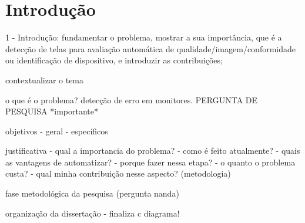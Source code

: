 \chapter{Introdução}



1 - Introdução: fundamentar o problema, mostrar a sua importância, que é a detecção de telas para avaliação automática de qualidade/imagem/conformidade ou identificação de dispositivo, e introduzir as contribuições;

contextualizar o tema

o que é o problema?
detecção de erro em monitores.
PERGUNTA DE PESQUISA *importante*

objetivos
 - geral
 - específicos
 
justificativa
 - qual a importancia do problema?
 - como é feito atualmente?
 - quais as vantagens de automatizar?
 - porque fazer nessa etapa?
 - o quanto o problema custa?
 - qual minha contribuição nesse aspecto? (metodologia)

fase metodológica da pesquisa (pergunta nanda)

organização da dissertação
 - finaliza c diagrama!